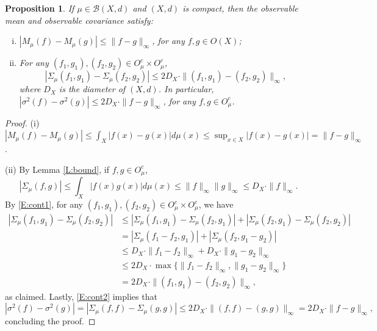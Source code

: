 \documentclass[11pt]{article}
\newtheorem{proposition}[theorem]{Proposition}
\theoremstyle{definition}
\newcommand{\obs}[1]{\ensuremath{O(#1)}}
\newcommand{\cobs}[1]{\ensuremath{O^c_{#1}}}
\newcommand{\borel}{\ensuremath{\mathcal{B}}}
\begin{document}
\begin{proposition} \label{P:continuity}
If $\mu \in \borel (X,d)$ and $(X,d)$ is compact, then the observable mean and observable covariance satisfy:
\begin{enumerate}[(i)]
\item $|M_\mu (f) - M_\mu(g)| \leq \|f-g\|_\infty$, for any $f,g \in \obs{X}$;
\item For any $(f_1,g_1), (f_2,g_2) \in \cobs{\mu} \times \cobs{\mu}$,
\[
|\Sigma_\mu (f_1,g_1) - \Sigma_\mu (f_2,g_2)|  \leq 2D_X \cdot \|(f_1,g_1)-(f_2,g_2)\|_\infty,
\]
where $D_X$ is the diameter of $(X,d)$. In particular, $|\sigma^2 (f) - \sigma^2(g)| \leq 2 D_X \cdot \|f-g\|_\infty$,
for any $f,g \in \cobs{\mu}$.
\end{enumerate}
\end{proposition}

\begin{proof}
(i) $|M_\mu (f)-M_\mu(g)| \leq \int_X |f(x)-g(x)| d\mu (x) \leq \sup_{x\in X} |f(x)-g(x)| = \|f-g\|_\infty$.

\medskip

(ii) By Lemma \ref{L:bound}, if $f,g \in \cobs{\mu}$,
\begin{equation} \label{E:cont1}
|\Sigma_\mu (f,g)| \leq \int_X |f(x) g(x)| d\mu (x) \leq \|f\|_\infty \|g\|_\infty \leq D_X \cdot \|f\|_\infty.
\end{equation}
By \eqref{E:cont1}, for any $(f_1,g_1), (f_2,g_2) \in \cobs{\mu} \times \cobs{\mu}$, we have
\begin{equation}\label{E:cont2}
\begin{split}
|\Sigma_\mu (f_1,g_1) - \Sigma_\mu (f_2,g_2)| &\leq 
|\Sigma_\mu (f_1,g_1) - \Sigma_\mu (f_2,g_1)| + |\Sigma_\mu (f_2,g_1) - \Sigma_\mu (f_2,g_2)|  \\
&= |\Sigma_\mu (f_1-f_2,g_1)| + |\Sigma_\mu (f_2,g_1-g_2)| \\
&\leq D_X \cdot \|f_1-f_2\|_\infty + D_X \cdot \|g_1-g_2\|_\infty \\
&\leq 2 D_X \cdot \max\{\|f_1-f_2\|_\infty, \|g_1-g_2\|_\infty\} \\
&= 2D_X \cdot \|(f_1,g_1)-(f_2,g_2)\|_\infty,
\end{split}
\end{equation}
as claimed. Lastly, \eqref{E:cont2} implies that
\begin{equation}
|\sigma^2 (f) - \sigma^2(g)| = |\Sigma_\mu(f,f) - \Sigma_\mu(g,g)|  
\leq 2D_X \cdot \|(f,f)-(g,g)\|_\infty = 2D_X \cdot \|f-g\|_\infty,
\end{equation}
concluding the proof.

\end{proof}
\end{document}
